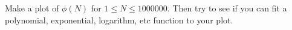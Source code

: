   Make a plot of $\phi(N)$ for $1 \leq N \leq 1000000$.
  Then try to see if you can fit a polynomial, exponential, logarithm, etc function
  to your plot.

